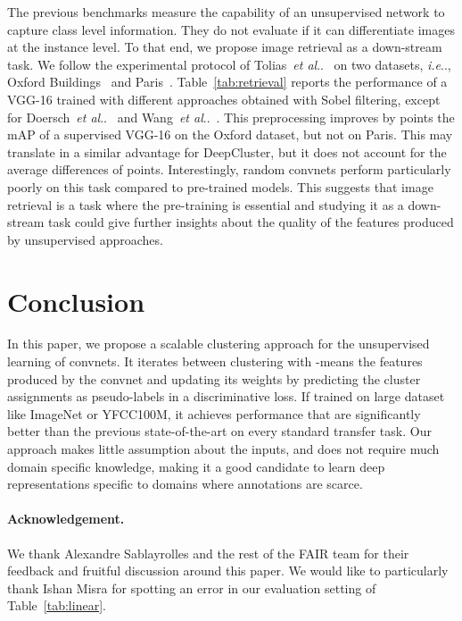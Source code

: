\documentclass[runningheads]{llncs}
\makeatletter
\DeclareRobustCommand\onedot{\futurelet\@let@token\@onedot}
\def\@onedot{\ifx\@let@token.\else.\null\fi\xspace}
\def\ie{\emph{i.e}\onedot} \def\Ie{\emph{I.e}\onedot}
\def\etal{\emph{et al}\onedot}
\def\OURS{DeepCluster\xspace}
\makeatother
\begin{document}
The previous benchmarks measure the capability of an unsupervised network to capture class level information.
They do not evaluate if it can differentiate images at the instance level.
To that end, we propose image retrieval as a down-stream task.
We follow the experimental protocol of Tolias~\etal~\cite{tolias2015particular} on two datasets, \ie, Oxford Buildings~\cite{Philbin07} and Paris~\cite{Philbin08}.
Table~\ref{tab:retrieval} reports the performance of a VGG-16 trained with different approaches obtained with Sobel filtering, except for Doersch~\etal~\cite{doersch2015unsupervised} and Wang~\etal~\cite{wang2017transitive}.
This preprocessing improves by  points the mAP of a supervised VGG-16 on the Oxford dataset, but not on Paris.
This may translate in a similar advantage for \OURS, but it does not account for the average differences of  points.
Interestingly, random convnets perform particularly poorly on this task compared to pre-trained models.
This suggests that image retrieval is a task where the pre-training is essential and studying it as a down-stream task could give further insights about the quality of the features produced by unsupervised approaches.
 \section{Conclusion}

In this paper, we propose a scalable clustering approach for the unsupervised learning of convnets.
It iterates between clustering  with -means the features produced by the convnet and
updating its weights by predicting the cluster assignments as pseudo-labels in a discriminative loss.
If trained on large dataset like ImageNet or YFCC100M, it achieves performance that are significantly
better than the previous state-of-the-art on every standard transfer task.
Our approach makes little assumption about the inputs, and does not require much domain specific knowledge, making it a
good candidate to learn deep representations specific to domains where annotations are scarce.

\paragraph{Acknowledgement.}
We thank Alexandre Sablayrolles and the rest of the FAIR team for their feedback and fruitful discussion around this paper.
We would like to particularly thank Ishan Misra for spotting an error in our evaluation setting of Table~\ref{tab:linear}.
\end{document}
